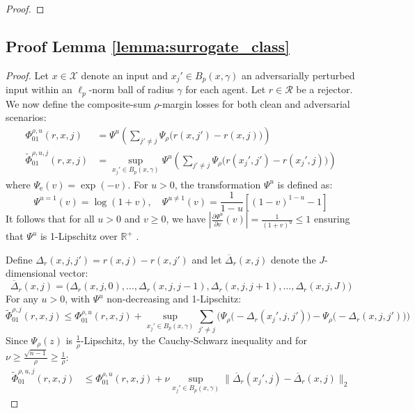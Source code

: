 \begin{appendices}
\begin{proof}
\end{proof}

\subsection{Proof Lemma \ref{lemma:surrogate_class}} \label{appendix:smooth}
\surrogatemulti*
\begin{proof}
Let \( x \in \mathcal{X} \) denote an input  and \( x_j' \in B_p(x, \gamma) \) an adversarially perturbed input within an \( \ell_p \)-norm ball of radius \( \gamma \) for each agent. Let \( r \in \mathcal{R} \) be a rejector. We now define the composite-sum \(\rho\)-margin losses for both clean and adversarial scenarios:
\begin{equation}
\begin{aligned}
    \Phi^{\rho, u}_{01}(r, x, j) & = \Psi^u \left( \sum_{j' \neq j} \Psi_\rho \big(r(x, j') - r(x, j)\big) \right) \\
    \widetilde{\Phi}^{\rho,u,j}_{01}(r, x, j) & = \sup_{x_j' \in B_p(x, \gamma)} \Psi^u \left( \sum_{j' \neq j} \Psi_\rho \big(r(x_j', j') - r(x_j', j)\big) \right)
\end{aligned}
\end{equation}
where \(\Psi_{\text{e}}(v) = \exp(-v)\). For \( u > 0 \), the transformation \(\Psi^u\) is defined as:
\[
\Psi^{u=1}(v) = \log(1 + v), \quad \Psi^{u \neq 1}(v) = \frac{1}{1 - u} \left[(1 - v)^{1 - u} - 1\right]
\]
It follows that for all \( u>0 \) and \( v \geq 0 \), we have \( \left| \frac{\partial \Psi^u}{\partial v}(v) \right| = \frac{1}{(1+v)^u} \leq 1 \)  ensuring that \(\Psi^u\) is 1-Lipschitz over \(\mathbb{R}^+\) \citep{mao2023crossentropylossfunctionstheoretical}. 

Define \( \Delta_r(x, j, j') = r(x, j) - r(x, j') \) and let \( \overline{\Delta}_r(x, j) \) denote the \( J \)-dimensional vector:
\[
\overline{\Delta}_r(x, j) = \big( \Delta_r(x, j, 0), \ldots, \Delta_r(x, j, j-1), \Delta_r(x, j, j+1), \ldots, \Delta_r(x, j, J) \big)
\]
For any \( u>0 \), with \(\Psi^u\) non-decreasing and 1-Lipschitz:
\begin{equation}
    \widetilde{\Phi}_{01}^{\rho, j}(r, x, j) \leq \Phi_{01}^{\rho, u}(r, x, j) + \sup_{x_j' \in B_p(x, \gamma)} \sum_{j' \neq j} \Big( \Psi_\rho \big(-\Delta_r(x_j', j, j')\big) - \Psi_\rho \big(-\Delta_r(x, j, j')\big) \Big)
\end{equation}
Since \(\Psi_\rho(z)\) is \(\frac{1}{\rho}\)-Lipschitz, by the Cauchy-Schwarz inequality and for \(\nu \geq \frac{\sqrt{n-1}}{\rho} \geq \frac{1}{\rho}\):
\begin{equation}
\begin{aligned}
    \widetilde{\Phi}_{01}^{\rho,u,j}(r, x, j) & \leq \Phi_{01}^{\rho, u}(r, x, j) + \nu \sup_{x_j' \in B_p(x, \gamma)} \| \overline{\Delta}_r(x_j', j) - \overline{\Delta}_r(x, j) \|_2
\end{aligned}
\end{equation}


\end{proof}
\end{appendices}
